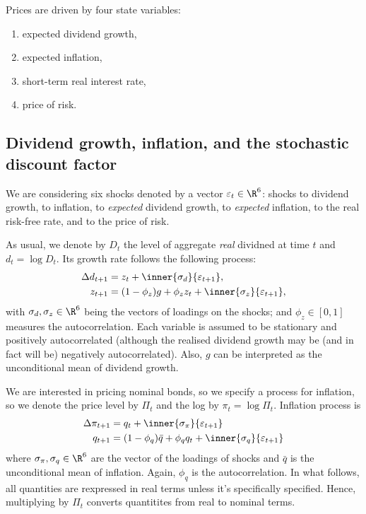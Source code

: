 Prices are driven by four state variables: 

\begin{enumerate}
	\item expected dividend growth,
	\item expected inflation,
	\item short-term real interest rate,
	\item price of risk.
\end{enumerate}

\subsection{Dividend growth, inflation, and the stochastic discount factor}

We are considering six shocks denoted by a vector $\varepsilon_{t}\in\R^{6}$: shocks to dividend growth, to inflation, to \emph{expected} dividend growth, to \emph{expected} inflation, to the real risk-free rate, and to the price of risk.

As usual, we denote by $D_t$ the level of aggregate \emph{real} dividned at time $t$ and $d_t = \log D_t$. Its growth rate follows the following process:
\begin{equation}
	\begin{aligned}
			\Delta d_{t+1} & = z_t + \inner{\sigma_d}{\varepsilon_{t+1}},\\
			z_{t+1} & = (1-\phi_z) g + \phi_z z_t + \inner{\sigma_z}{\varepsilon_{t+1}},
	\end{aligned}
\end{equation}
with $\sigma_d,\sigma_z\in\R^6$ being the vectors of loadings on the shocks; and $\phi_z\in[0,1]$ measures the autocorrelation. Each variable is assumed to be stationary and positively autocorrelated (although the realised dividend growth may be (and in fact will be) negatively autocorrelated). Also, $g$ can be interpreted as the unconditional mean of dividend growth.

We are interested in pricing nominal bonds, so we specify a process for inflation, so we denote the price level by $\Pi_t$ and the log by $\pi_t = \log \Pi_t$. Inflation process is 
\begin{equation}
	\begin{aligned}
		\Delta \pi_{t+1} & = q_t + \inner{\sigma_\pi}{\varepsilon_{t+1}}\\
		q_{t+1} & = (1-\phi_q)\bar{q} + \phi_q q_t + \inner{\sigma_q}{\varepsilon_{t+1}}
	\end{aligned}
\end{equation}
where $\sigma_\pi, \sigma_q\in\R^6$ are the vector of the loadings of shocks and $\bar{q}$ is the unconditional mean of inflation. Again, $\phi_q$ is the autocorrelation. In what follows, all quantities are rexpressed in real terms unless it's specifically specified. Hence, multiplying by $\Pi_t$ converts quantitites from real to nominal terms.

